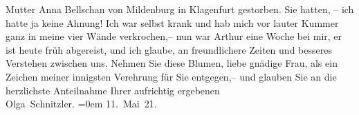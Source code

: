 \begin{ledgroupsized}[t]{13cm}
{{{                  Mutter Anna Bellschan von Mildenburg in Klagenfurt gestorben.}}}\label{K_L02367-2h} Sie hatten, – ich hatte ja
               keine Ahnung! Ich war selbst krank und hab mich vor lauter Kummer ganz in meine vier
               Wände verkrochen,– nun war Arthur eine Woche
               bei mir, er ist heute früh abgereist, und ich glaube, an freundlichere Zeiten und
               besseres Verstehen zwischen uns.\pend
           \pstart
           Nehmen Sie diese Blumen, liebe gnädige Frau, als ein Zeichen meiner innigsten
               Verehrung für Sie entgegen,– und glauben Sie an die herzlichste Anteilnahme{\pb}\pend
           \pstart
           Ihrer aufrichtig ergebenen{\\[\baselineskip]}\spacefill\mbox{Olga Schnitzler.}\pend
           \leftskip=0em{}\pstart
           \noindent{}11. Mai 21. \pend
           
         
         \endnumbering{}\end{ledgroupsized}  \newcommand{\dateiname}{L02367}\newcommand{\titel}{Olga Schnitzler an Anna Bahr-Mildenburg, 11. 5. 1921}\newcommand{\editorInnen}{ Martin Anton Müller und Gerd-Hermann Susen}
      